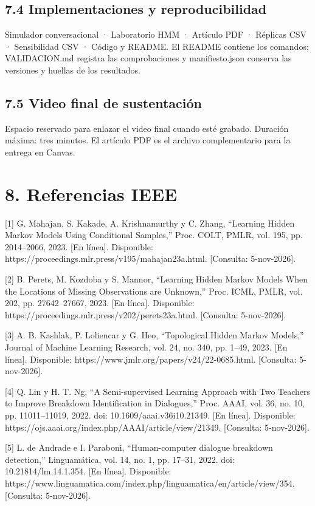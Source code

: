 \documentclass[10pt,a4paper]{article}
\begin{document}
\subsection*{7.4 Implementaciones y reproducibilidad}
Simulador conversacional · Laboratorio HMM · Artículo PDF · Réplicas CSV · Sensibilidad CSV · Código y README. El README contiene los comandos; VALIDACION.md registra las comprobaciones y manifiesto.json conserva las versiones y huellas de los resultados.


\subsection*{7.5 Video final de sustentación}
Espacio reservado para enlazar el video final cuando esté grabado. Duración máxima: tres minutos. El artículo PDF es el archivo complementario para la entrega en Canvas.


\clearpage
\section*{8. Referencias IEEE}
[1] G. Mahajan, S. Kakade, A. Krishnamurthy y C. Zhang, “Learning Hidden Markov Models Using Conditional Samples,” Proc. COLT, PMLR, vol. 195, pp. 2014–2066, 2023. [En línea]. Disponible: https://proceedings.mlr.press/v195/mahajan23a.html. [Consulta: 5-nov-2026].


[2] B. Perets, M. Kozdoba y S. Mannor, “Learning Hidden Markov Models When the Locations of Missing Observations are Unknown,” Proc. ICML, PMLR, vol. 202, pp. 27642–27667, 2023. [En línea]. Disponible: https://proceedings.mlr.press/v202/perets23a.html. [Consulta: 5-nov-2026].


[3] A. B. Kashlak, P. Loliencar y G. Heo, “Topological Hidden Markov Models,” Journal of Machine Learning Research, vol. 24, no. 340, pp. 1–49, 2023. [En línea]. Disponible: https://www.jmlr.org/papers/v24/22-0685.html. [Consulta: 5-nov-2026].


[4] Q. Lin y H. T. Ng, “A Semi-supervised Learning Approach with Two Teachers to Improve Breakdown Identification in Dialogues,” Proc. AAAI, vol. 36, no. 10, pp. 11011–11019, 2022. doi: 10.1609/aaai.v36i10.21349. [En línea]. Disponible: https://ojs.aaai.org/index.php/AAAI/article/view/21349. [Consulta: 5-nov-2026].


[5] L. de Andrade e I. Paraboni, “Human-computer dialogue breakdown detection,” Linguamática, vol. 14, no. 1, pp. 17–31, 2022. doi: 10.21814/lm.14.1.354. [En línea]. Disponible: https://www.linguamatica.com/index.php/linguamatica/en/article/view/354. [Consulta: 5-nov-2026].
\end{document}
